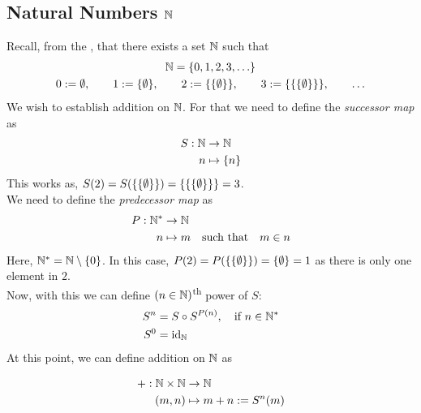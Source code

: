 \subsection[Natural Numbers]{Natural Numbers \(\N\)}
Recall, from the , that there exists a set \(\N\) such that
\begin{equation}
	\begin{gathered}
		\mathbb N = \qty{0, 1, 2, 3, \ldots} \\
		0 := \emptyset, \qquad 1 := \qty{\emptyset}, \qquad 2 := \qty{\qty{\emptyset}}, \qquad 3 := \qty{\qty{\qty{\emptyset}}}, \qquad \ldots
	\end{gathered}
\end{equation}
We wish to establish addition on \(\N\). For that we need to define the \emph{successor map} as
\begin{equation}
	\begin{aligned}
		S: \mathbb N & \to \mathbb N          \\
		n     & \mapsto \qty{n}
	\end{aligned}
\end{equation}
This works as, \(S(2) = S(\qty{\qty{\emptyset}}) = \qty{\qty{\qty{\emptyset}}} = 3\).\\
We need to define the \emph{predecessor map} as
\begin{equation}
	\begin{aligned}
		P: \mathbb N^\ast & \to \mathbb N                                         \\
		n          & \mapsto m \quad \text{such that} \quad m \in n
	\end{aligned}
\end{equation}
Here, \(\mathbb N^\ast = \mathbb N \setminus \qty{0}\). In this case, \(P(2) = P(\qty{\qty{\emptyset}}) = \qty{\emptyset} = 1\) as there is only one element in \(2\).\\
Now, with this we can define \((n \in \mathbb N)\)\textsuperscript{th} power of \(S\):
\begin{equation}
	\begin{aligned}
		S^{n} & = S \circ S^{P(n)}, \quad \text{if}\ n \in \mathbb N^\ast \\
		S^0   & = \operatorname{id}_\mathbb N
	\end{aligned}
\end{equation}
At this point, we can define addition on \(\N\) as
\begin{definition}[Addition on \(\N\)]
	\begin{equation}
		\begin{aligned}
			+: \mathbb N \times \mathbb N & \to \mathbb N                  \\
			(m, n)          & \mapsto m + n := S^n(m)
		\end{aligned}
	\end{equation}
\end{definition}
